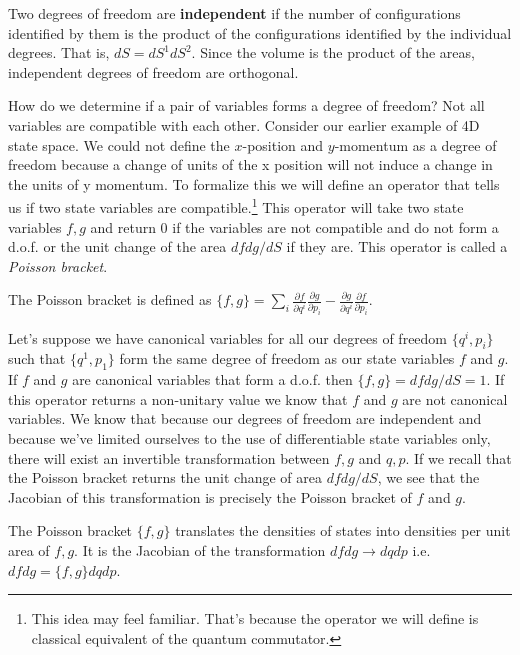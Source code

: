 \documentclass{article}
\begin{document}
\begin{defn}
	Two degrees of freedom are \textbf{independent} if the number of configurations identified by them is the product of the configurations identified by the individual degrees. That is, $dS = dS^1 dS^2$. Since the volume is the product of the areas, independent degrees of freedom are orthogonal.
\end{defn}

	How do we determine if a pair of variables forms a degree of freedom? Not all variables are compatible with each other. Consider our earlier example of 4D state space. We could not define the $x$-position and $y$-momentum as a degree of freedom because a change of units of the x position will not induce a change in the units of y momentum. To formalize this we will define an operator that tells us if two state variables are compatible.\footnote{This idea may feel familiar. That's because the operator we will define is classical equivalent of the quantum commutator.} This operator will take two state variables $f,g$ and return 0 if the variables are not compatible and do not form a d.o.f. or the unit change of the area $dfdg/dS$ if they are. This operator is called a \textit{Poisson bracket}.

\begin{defn}
	The Poisson bracket is defined as $\{f,g\} = \sum_i \frac{\partial f}{\partial q^i}\frac{\partial g}{\partial p_i} - \frac{\partial g}{\partial q^i}\frac{\partial f}{\partial p_i}$.
\end{defn}

	Let's suppose we have canonical variables for all our degrees of freedom $\{q^i,p_i\}$ such that $\{q^1,p_1\}$ form the same degree of freedom as our state variables $f$ and $g$. If $f$ and $g$ are canonical variables that form a d.o.f. then $\{f,g \} = dfdg/dS = 1$. If this operator returns a non-unitary value we know that $f$ and $g$ are not canonical variables. We know that because our degrees of freedom are independent and because we've limited ourselves to the use of differentiable state variables only, there will exist an invertible transformation between $f,g$ and $q,p$. If we recall that the Poisson bracket returns the unit change of area $dfdg/dS$, we see that the Jacobian of this transformation is precisely the Poisson bracket of $f$ and $g$.

\begin{prop}
	The Poisson bracket $\{f, g\}$ translates the densities of states into densities per unit area of $f, g$. It is the Jacobian of the transformation $dfdg \rightarrow dqdp$ i.e. $dfdg = \{f,g\}dqdp$.
\end{prop}
	
\end{document}
